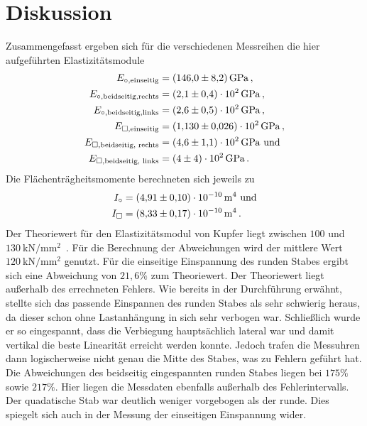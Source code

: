 \section{Diskussion}
\label{sec:Diskussion}
Zusammengefasst ergeben sich für die verschiedenen Messreihen die hier aufgeführten 
Elastizitätsmodule
\begin{align*}
    E_{\circ,\text{einseitig}}&=\qty{146(8,2)}{\giga\pascal}\,,\\
    E_{\circ,\text{beidseitig,rechts}}&=\qty{2.1(0.4)e2}{\giga\pascal}\,,\\
    E_{\circ,\text{beidseitig,links}}&=\qty{2.6(0.5)e2}{\giga\pascal}\,,\\
    E_{\square,\text{einseitig}}&=\qty{1,13(0.026)e2}{\giga\pascal}\,,\\
    E_{\square,\text{beidseitig, rechts}}&=\qty{4.6(1.1)e2}{\giga\pascal}\text{ und}\\
    E_{\square,\text{beidseitig, links}}&=\qty{4(4)e2}{\giga\pascal}\,.\\
\end{align*}
Die Flächenträgheitsmomente berechneten sich jeweils zu 
\begin{align*}
    I_\circ&=\qty{4,91(0.10)e-10}{\meter\tothe{4}}\text{ und}\\
    I_\square&=\qty{8,33(0,17)e-10}{\meter\tothe{4}}\,.
\end{align*}
Der Theoriewert für den Elastizitätsmodul von Kupfer liegt zwischen $100$ und $\qty{130}{\kilo\newton\per\milli\meter\squared}$\,
\cite{Elastizitätsmodul}.
Für die Berechnung der Abweichungen wird der mittlere Wert $\qty{120}{\kilo\newton\per\milli\meter\squared}$ genutzt.
Für die einseitige Einspannung des runden Stabes ergibt sich eine Abweichung von $21,6\%$ zum Theoriewert. Der Theoriewert liegt außerhalb 
des errechneten Fehlers. Wie bereits in der Durchführung erwähnt, stellte sich das passende Einspannen des runden Stabes als sehr schwierig
heraus, da dieser schon ohne Lastanhängung in sich sehr verbogen war. Schließlich wurde er so eingespannt, dass die Verbiegung hauptsächlich
lateral war und damit vertikal die beste Linearität erreicht werden konnte. Jedoch trafen die Messuhren dann logischerweise nicht genau die 
Mitte des Stabes, was zu Fehlern geführt hat.
Die Abweichungen des beidseitig eingespannten runden Stabes liegen bei $175\%$ sowie $217\%$. Hier liegen die Messdaten ebenfalls außerhalb des 
Fehlerintervalls.
Der quadatische Stab war deutlich weniger vorgebogen als der runde. Dies spiegelt sich auch in der Messung der einseitigen Einspannung wider.
